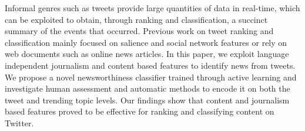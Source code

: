 Informal genres such as tweets provide large quantities of data in real-time, which can be exploited to obtain, through ranking and classification, a succinct summary of the events that occurred. Previous work on tweet ranking and classification mainly focused on salience and social network features or rely on web documents such as online news articles. In this paper, we exploit language independent journalism and content based features to identify news from tweets. We propose a novel newsworthiness classifier trained through active learning and investigate human assessment and automatic methods to encode it on both the tweet and trending topic levels. Our findings show that content and journalism based features proved to be effective for ranking and classifying content on Twitter.
